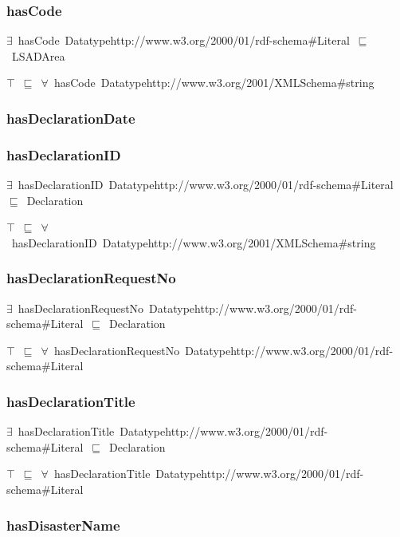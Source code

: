 \documentclass{article}
\begin{document}
\subsubsection*{hasCode}

\ensuremath{\exists}~hasCode~Datatypehttp://www.w3.org/2000/01/rdf-schema#Literal~\ensuremath{\sqsubseteq}~LSADArea

\ensuremath{\top}~\ensuremath{\sqsubseteq}~\ensuremath{\forall}~hasCode~Datatypehttp://www.w3.org/2001/XMLSchema#string

\subsubsection*{hasDeclarationDate}

\subsubsection*{hasDeclarationID}

\ensuremath{\exists}~hasDeclarationID~Datatypehttp://www.w3.org/2000/01/rdf-schema#Literal~\ensuremath{\sqsubseteq}~Declaration

\ensuremath{\top}~\ensuremath{\sqsubseteq}~\ensuremath{\forall}~hasDeclarationID~Datatypehttp://www.w3.org/2001/XMLSchema#string

\subsubsection*{hasDeclarationRequestNo}

\ensuremath{\exists}~hasDeclarationRequestNo~Datatypehttp://www.w3.org/2000/01/rdf-schema#Literal~\ensuremath{\sqsubseteq}~Declaration

\ensuremath{\top}~\ensuremath{\sqsubseteq}~\ensuremath{\forall}~hasDeclarationRequestNo~Datatypehttp://www.w3.org/2000/01/rdf-schema#Literal

\subsubsection*{hasDeclarationTitle}

\ensuremath{\exists}~hasDeclarationTitle~Datatypehttp://www.w3.org/2000/01/rdf-schema#Literal~\ensuremath{\sqsubseteq}~Declaration

\ensuremath{\top}~\ensuremath{\sqsubseteq}~\ensuremath{\forall}~hasDeclarationTitle~Datatypehttp://www.w3.org/2000/01/rdf-schema#Literal

\subsubsection*{hasDisasterName}
\end{document}
